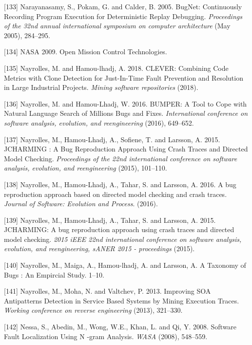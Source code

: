 \documentclass[12pt]{report}
\begin{document}
\hypertarget{ref-Narayanasamy2005}{}
{[}133{]} Narayanasamy, S., Pokam, G. and Calder, B. 2005. BugNet:
Continuously Recording Program Execution for Deterministic Replay
Debugging. \emph{Proceedings of the 32nd annual international symposium
on computer architecture} (May 2005), 284--295.

\hypertarget{ref-NASA2009}{}
{[}134{]} NASA 2009. Open Mission Control Technologies.

\hypertarget{ref-Nayrolles2018}{}
{[}135{]} Nayrolles, M. and Hamou-lhadj, A. 2018. CLEVER: Combining Code
Metrics with Clone Detection for Just-In-Time Fault Prevention and
Resolution in Large Industrial Projects. \emph{Mining software
repositories} (2018).

\hypertarget{ref-Nayrolles2016b}{}
{[}136{]} Nayrolles, M. and Hamou-Lhadj, W. 2016. BUMPER: A Tool to Cope
with Natural Language Search of Millions Bugs and Fixes.
\emph{International conference on software analysis, evolution, and
reengineering} (2016), 649--652.

\hypertarget{ref-Nayrolles2015}{}
{[}137{]} Nayrolles, M., Hamou-Lhadj, A., Sofiene, T. and Larsson, A.
2015. JCHARMING : A Bug Reproduction Approach Using Crash Traces and
Directed Model Checking. \emph{Proceedings of the 22nd international
conference on software analysis, evolution, and reengineering} (2015),
101--110.

\hypertarget{ref-Nayrolles2016d}{}
{[}138{]} Nayrolles, M., Hamou-Lhadj, A., Tahar, S. and Larsson, A.
2016. A bug reproduction approach based on directed model checking and
crash traces. \emph{Journal of Software: Evolution and Process}. (2016).

\hypertarget{ref-Nayrolles2015g}{}
{[}139{]} Nayrolles, M., Hamou-Lhadj, A., Tahar, S. and Larsson, A.
2015. JCHARMING: A bug reproduction approach using crash traces and
directed model checking. \emph{2015 iEEE 22nd international conference
on software analysis, evolution, and reengineering, sANER 2015 -
proceedings} (2015).

\hypertarget{ref-Nayrolles}{}
{[}140{]} Nayrolles, M., Maiga, A., Hamou-lhadj, A. and Larsson, A. A
Taxonomy of Bugs : An Empircial Study. 1--10.

\hypertarget{ref-Nayrolles2013a}{}
{[}141{]} Nayrolles, M., Moha, N. and Valtchev, P. 2013. Improving SOA
Antipatterns Detection in Service Based Systems by Mining Execution
Traces. \emph{Working conference on reverse engineering} (2013),
321--330.

\hypertarget{ref-Nessa2008}{}
{[}142{]} Nessa, S., Abedin, M., Wong, W.E., Khan, L. and Qi, Y. 2008.
Software Fault Localization Using N -gram Analysis. \emph{WASA} (2008),
548--559.
\end{document}
